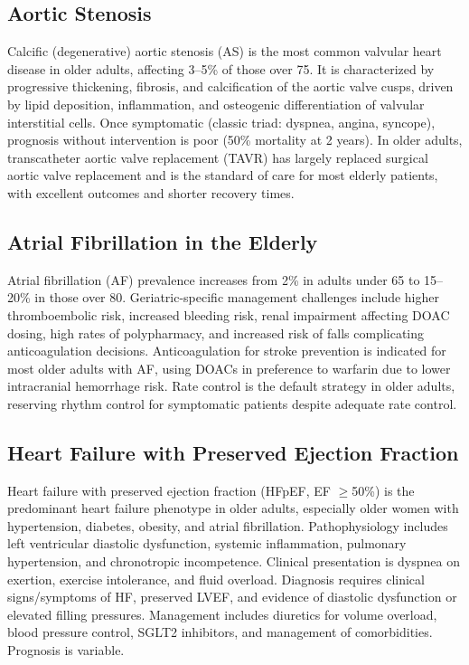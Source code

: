 \subsection{Aortic Stenosis}
\label{sec:geriatric:Aortic Stenosis}
Calcific (degenerative) aortic stenosis (AS) is the most common valvular heart disease in older adults, affecting 3--5\% of those over 75. It is characterized by progressive thickening, fibrosis, and calcification of the aortic valve cusps, driven by lipid deposition, inflammation, and osteogenic differentiation of valvular interstitial cells. Once symptomatic (classic triad: dyspnea, angina, syncope), prognosis without intervention is poor (50\% mortality at 2 years). In older adults, transcatheter aortic valve replacement (TAVR) has largely replaced surgical aortic valve replacement and is the standard of care for most elderly patients, with excellent outcomes and shorter recovery times.

\subsection{Atrial Fibrillation in the Elderly}
\label{sec:Atrial Fibrillation in the Elderly}
Atrial fibrillation (AF) prevalence increases from 2\% in adults under 65 to 15--20\% in those over 80. Geriatric-specific management challenges include higher thromboembolic risk, increased bleeding risk, renal impairment affecting DOAC dosing, high rates of polypharmacy, and increased risk of falls complicating anticoagulation decisions. Anticoagulation for stroke prevention is indicated for most older adults with AF, using DOACs in preference to warfarin due to lower intracranial hemorrhage risk. Rate control is the default strategy in older adults, reserving rhythm control for symptomatic patients despite adequate rate control.

\subsection{Heart Failure with Preserved Ejection Fraction}
\label{sec:geriatric:Heart Failure with Preserved Ejection Fraction}
Heart failure with preserved ejection fraction (HFpEF, EF $\ge$50\%) is the predominant heart failure phenotype in older adults, especially older women with hypertension, diabetes, obesity, and atrial fibrillation. Pathophysiology includes left ventricular diastolic dysfunction, systemic inflammation, pulmonary hypertension, and chronotropic incompetence. Clinical presentation is dyspnea on exertion, exercise intolerance, and fluid overload. Diagnosis requires clinical signs/symptoms of HF, preserved LVEF, and evidence of diastolic dysfunction or elevated filling pressures. Management includes diuretics for volume overload, blood pressure control, SGLT2 inhibitors, and management of comorbidities. Prognosis is variable.

